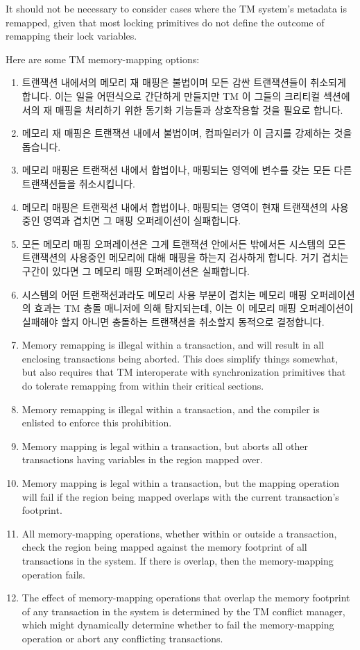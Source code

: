 It should not be necessary to consider cases where the TM system's
metadata is remapped, given that most locking primitives do not define
the outcome of remapping their lock variables.

Here are some TM memory-mapping options:

\fi

\begin{enumerate}
\item	트랜잭션 내에서의 메모리 재 매핑은 불법이며 모든 감싼 트랜잭션들이
	취소되게 합니다.
	이는 일을 어떤식으로 간단하게 만들지만 TM 이 그들의 크리티컬 섹션에서의
	재 매핑을 처리하기 위한 동기화 기능들과 상호작용할 것을 필요로 합니다.
\item	메모리 재 매핑은 트랜잭션 내에서 불법이며, 컴파일러가 이 금지를
	강제하는 것을 돕습니다.
\item	메모리 매핑은 트랜잭션 내에서 합법이나, 매핑되는 영역에 변수를 갖는
	모든 다른 트랜잭션들을 취소시킵니다.
\item	메모리 매핑은 트랜잭션 내에서 합법이나, 매핑되는 영역이 현재 트랜잭션의
	사용중인 영역과 겹치면 그 매핑 오퍼레이션이 실패합니다.
\item	모든 메모리 매핑 오퍼레이션은 그게 트랜잭션 안에서든 밖에서든 시스템의
	모든 트랜잭션의 사용중인 메모리에 대해 매핑을 하는지 검사하게 합니다.
	거기 겹치는 구간이 있다면 그 메모리 매핑 오퍼레이션은 실패합니다.
\item	시스템의 어떤 트랜잭션과라도 메모리 사용 부분이 겹치는 메모리 매핑
	오퍼레이션의 효과는 TM 충돌 매니저에 의해 탐지되는데, 이는 이 메모리
	매핑 오퍼레이션이 실패해야 할지 아니면 충돌하는 트랜잭션을 취소할지
	동적으로 결정합니다.

\iffalse

\item	Memory remapping is illegal within a transaction, and will result
	in all enclosing transactions being aborted.
	This does simplify things somewhat, but also requires that TM
	interoperate with synchronization primitives that do tolerate
	remapping from within their critical sections.
\item	Memory remapping is illegal within a transaction, and the
	compiler is enlisted to enforce this prohibition.
\item	Memory mapping is legal within a transaction, but aborts all
	other transactions having variables in the region mapped over.
\item	Memory mapping is legal within a transaction, but the mapping
	operation will fail if the region being mapped overlaps with
	the current transaction's footprint.
\item	All memory-mapping operations, whether within or outside a
	transaction, check the region being mapped against the memory
	footprint of all transactions in the system.
	If there is overlap, then the memory-mapping operation fails.
\item	The effect of memory-mapping operations that overlap the memory
	footprint of any transaction in the system is determined by the
	TM conflict manager, which might dynamically determine whether
	to fail the memory-mapping operation or abort any conflicting
	transactions.


\end{enumerate}
